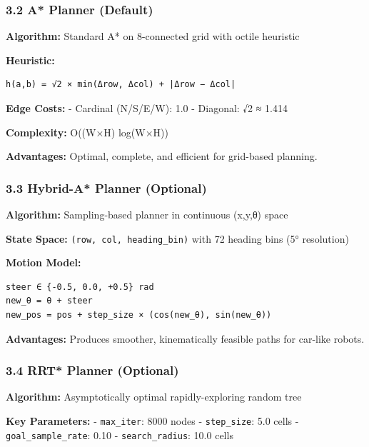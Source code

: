 \hypertarget{a-planner-default}{%
\subsubsection{3.2 A* Planner (Default)}\label{a-planner-default}}

\textbf{Algorithm:} Standard A* on 8-connected grid with octile
heuristic

\textbf{Heuristic:}

\begin{verbatim}
h(a,b) = √2 × min(Δrow, Δcol) + |Δrow − Δcol|
\end{verbatim}

\textbf{Edge Costs:} - Cardinal (N/S/E/W): 1.0 - Diagonal: √2 ≈ 1.414

\textbf{Complexity:} O((W×H) log(W×H))

\textbf{Advantages:} Optimal, complete, and efficient for grid-based
planning.

\hypertarget{hybrid-a-planner-optional}{%
\subsubsection{3.3 Hybrid-A* Planner
(Optional)}\label{hybrid-a-planner-optional}}

\textbf{Algorithm:} Sampling-based planner in continuous (x,y,θ) space

\textbf{State Space:} \texttt{(row,\ col,\ heading\_bin)} with 72
heading bins (5° resolution)

\textbf{Motion Model:}

\begin{verbatim}
steer ∈ {-0.5, 0.0, +0.5} rad
new_θ = θ + steer
new_pos = pos + step_size × (cos(new_θ), sin(new_θ))
\end{verbatim}

\textbf{Advantages:} Produces smoother, kinematically feasible paths for
car-like robots.

\hypertarget{rrt-planner-optional}{%
\subsubsection{3.4 RRT* Planner (Optional)}\label{rrt-planner-optional}}

\textbf{Algorithm:} Asymptotically optimal rapidly-exploring random tree

\textbf{Key Parameters:} - \texttt{max\_iter}: 8000 nodes -
\texttt{step\_size}: 5.0 cells - \texttt{goal\_sample\_rate}: 0.10 -
\texttt{search\_radius}: 10.0 cells

